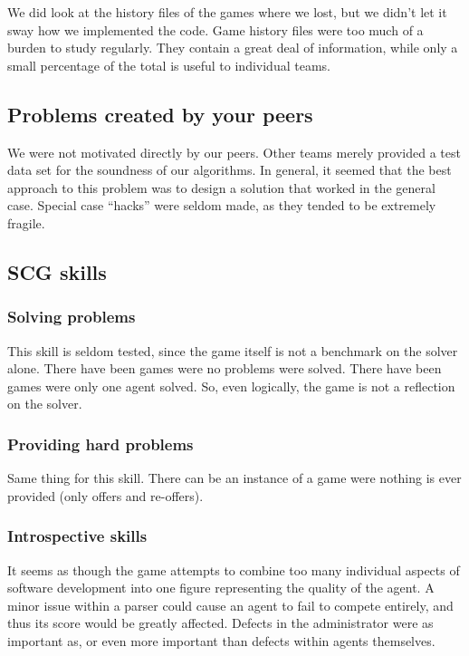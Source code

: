 \documentclass[letterpaper,12pt,oneside]{article}
\begin{document}
We did look at the history files of the games where we lost, but we didn't
let it sway how we implemented the code. Game history files were too much of
a burden to study regularly. They contain a great deal of information, while
only a small percentage of the total is useful to individual teams.

\subsection{Problems created by your peers}
We were not motivated directly by our peers. Other teams merely provided a test
data set for the soundness of our algorithms. In general, it seemed that the
best approach to this problem was to design a solution that worked in the
general case. Special case ``hacks'' were seldom made, as they tended to be
extremely fragile. 

\subsection{SCG skills}

\subsubsection{Solving problems}

This skill is seldom tested, since the game itself is not a benchmark on
the solver alone. There have been games were no problems were solved. There
have been games were only one agent solved. So, even logically, the game is
not a reflection on the solver.

\subsubsection{Providing hard problems}

Same thing for this skill. There can be an instance of a game were nothing
is ever provided (only offers and re-offers).

\subsubsection{Introspective skills}
It seems as though the game attempts to combine too many individual aspects of
software development into one figure representing the quality of the agent.
A minor issue within a parser could cause an agent to fail to compete
entirely, and thus its score would be greatly affected. Defects in the
administrator were as important as, or even more important than defects within
agents themselves.
\end{document}
